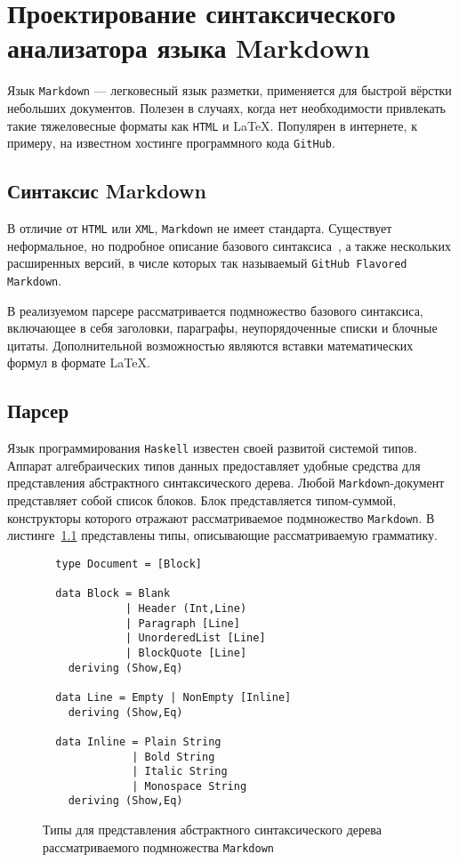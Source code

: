
\chapter{Проектирование синтаксического анализатора языка Markdown}

Язык \lstinline{Markdown} --- легковесный язык разметки, применяется для быстрой
вёрстки небольших документов. Полезен в случаях, когда нет необходимости привлекать
такие тяжеловесные форматы как \lstinline{HTML} и \LaTeX. Популярен в
интернете, к примеру, на известном хостинге программного кода
\lstinline{GitHub}.

\section{Синтаксис Markdown}

  В отличие от \lstinline{HTML} или \lstinline{XML}, \lstinline{Markdown} не имеет
  стандарта. Существует неформальное, но подробное описание базового
  синтаксиса~\cite{markdownSyntax}, а также нескольких расширенных версий, в
  числе которых так называемый \lstinline{GitHub Flavored Markdown}.

  В реализуемом парсере рассматривается подмножество базового синтаксиса,
  включающее в себя заголовки, параграфы, неупорядоченные списки и блочные цитаты.
  Дополнительной возможностью являются вставки математических формул в формате
  \LaTeX.

\section{Парсер}

  Язык программирования \lstinline{Haskell} известен своей развитой системой
  типов. Аппарат алгебраических типов данных предоставляет удобные средства для
  представления абстрактного синтаксического дерева. Любой
  \lstinline{Markdown}-документ представляет собой список блоков. Блок
  представляется типом-суммой, конструкторы которого отражают рассматриваемое
  подмножество \lstinline{Markdown}. В листинге~\ref{listing:MarkdownADT}
  представлены типы, описывающие рассматриваемую грамматику.

  \begin{figure}[t]
  \begin{lstlisting}
  type Document = [Block]

  data Block = Blank
             | Header (Int,Line)
             | Paragraph [Line]
             | UnorderedList [Line]
             | BlockQuote [Line]
    deriving (Show,Eq)

  data Line = Empty | NonEmpty [Inline]
    deriving (Show,Eq)

  data Inline = Plain String
              | Bold String
              | Italic String
              | Monospace String
    deriving (Show,Eq)
  \end{lstlisting}
  \caption{Типы для представления абстрактного синтаксического дерева
  рассматриваемого подмножества \lstinline{Markdown}}
  \label{listing:MarkdownADT}
  \end{figure}

